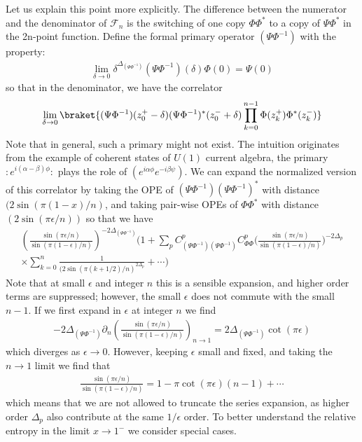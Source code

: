 \documentclass[11pt]{article}
\newcommand{\ep}{\epsilon}
\newcommand{\p}{\partial}
\newcommand{\nn}{\nonumber}
\newcommand{\lb}{\left(}
\newcommand{\rb}{\right)}
\begin{document}
Let us explain this point more explicitly. The difference between the numerator and the denominator of $\mathcal{F}_n$ is the switching of one copy $\Phi\Phi^*$ to a copy of $\Psi\Phi^*$ in the 2n-point function. Define the formal primary operator $(\Psi\Phi^{-1})$ with the property:
\begin{align}
    \lim_{\delta\to 0}\delta^{\Delta_{(\Psi\Phi^{-1})}}(\Psi\Phi^{-1})(\delta)\Phi(0)=\Psi(0)
\end{align}
so that in the denominator, we have the correlator
\begin{align}
  \lim_{\delta\to 0}  \braket{(\Psi\Phi^{-1})(z_0^+-\delta)(\Psi\Phi^{-1})^*(z_0^-+\delta)\prod_{k=0}^{n-1}\Phi(z_k^+)\Phi^*(z_k^-)}
\end{align}
Note that in general, such a primary might not exist. The intuition originates from the example of coherent states of $U(1)$ current algebra, the primary   $: e^{i(\alpha-\beta)\phi}:$ plays the role of $(e^{i\alpha \phi}e^{-i\beta\psi})$.
We can expand the normalized version of this correlator by taking the OPE of $(\Psi\Phi^{-1})(\Psi\Phi^{-1})^*$ with distance $(2\sin(\pi(1-x)/n)$, and taking pair-wise OPEs of $\Phi\Phi^*$ with distance $(2\sin(\pi \ep/n))$ so that we have
\begin{align}
    \lb \frac{\sin(\pi \ep/n)}{\sin(\pi (1-\ep)/n)}\rb^{-2\Delta_{(\Psi\Phi^{-1})}}\Bigg( 1+\sum_p C^p_{(\Psi\Phi^{-1})(\Psi\Phi^{-1})} C^p_{\Phi\Phi}\Bigg( \frac{\sin(\pi \ep/n)}{\sin(\pi (1-\ep)/n)}\Bigg)^{-2\Delta_p}\nn \\\times \sum_{k=0}^n\frac{1}{(2\sin(\pi (k+1/2)/n)^{2\Delta_p}}+\cdots\Bigg)
\end{align}
Note that at small $\ep$ and integer $n$ this is a sensible expansion, and higher order terms are suppressed; however, the small $\ep$ does not commute with the small $n-1$. If we first expand in $\ep$ at integer $n$ we find
\begin{align}
    -2\Delta_{(\Psi\Phi^{-1})}\p_n\lb \frac{\sin(\pi \ep/n)}{\sin(\pi (1-\ep)/n)}\rb_{n\to 1}=2\Delta_{(\Psi\Phi^{-1})}\cot(\pi\ep)
\end{align}
which diverges as $\ep\to 0$. However, keeping $\ep$ small and fixed, and taking the $n\to 1$ limit we find that 
\begin{align}
    \frac{\sin(\pi \ep/n)}{\sin(\pi (1-\ep)/n)}=1-\pi\cot(\pi \ep)(n-1)+\cdots
\end{align}
which means that we are not allowed to truncate the series expansion, as higher order $\Delta_p$ also contribute at the same $1/\ep$ order.
To better understand the relative entropy in the limit $x\to 1^-$ we consider special cases.
\end{document}
